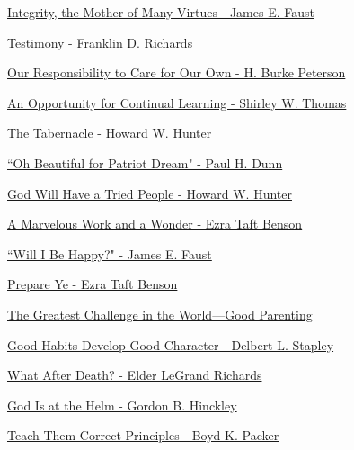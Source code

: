 \href{https://www.lds.org/general-conference/1982/04/integrity-the-mother-of-many-virtues?lang=eng}{Integrity, the Mother of Many Virtues - James E. Faust}

\href{https://www.lds.org/general-conference/1974/04/testimony?lang=eng}{Testimony - Franklin D. Richards}

\href{https://www.lds.org/general-conference/1981/04/our-responsibility-to-care-for-our-own?lang=eng}{Our Responsibility to Care for Our Own - H. Burke Peterson}

\href{https://www.lds.org/general-conference/1981/10/an-opportunity-for-continual-learning?lang=eng}{An Opportunity for Continual Learning - Shirley W. Thomas}

\href{https://www.lds.org/general-conference/1975/10/the-tabernacle?lang=eng}{The Tabernacle - Howard W. Hunter}

\href{https://www.lds.org/general-conference/1975/10/oh-beautiful-for-patriot-dream?lang=eng}{``Oh Beautiful for Patriot Dream" - Paul H. Dunn}

\href{https://www.lds.org/general-conference/1980/04/god-will-have-a-tried-people?lang=eng}{God Will Have a Tried People - Howard W. Hunter}

\href{https://www.lds.org/general-conference/1980/04/a-marvelous-work-and-a-wonder?lang=eng}{A Marvelous Work and a Wonder - Ezra Taft Benson}

\href{https://www.lds.org/general-conference/1987/04/will-i-be-happy?lang=eng}{``Will I Be Happy?" - James E. Faust}

\href{https://www.lds.org/general-conference/1973/10/prepare-ye?lang=eng}{Prepare Ye - Ezra Taft Benson}

\href{https://www.lds.org/general-conference/1990/10/the-greatest-challenge-in-the-world-good-parenting?lang=eng}{The Greatest Challenge in the World—Good Parenting}

\href{https://www.lds.org/general-conference/1974/10/good-habits-develop-good-character?lang=eng}{Good Habits Develop Good Character - Delbert L. Stapley}

\href{https://www.lds.org/general-conference/1974/10/what-after-death?lang=eng}{What After Death? - Elder LeGrand Richards}

\href{https://www.lds.org/general-conference/1994/04/god-is-at-the-helm?lang=eng}{God Is at the Helm - Gordon B. Hinckley}

\href{https://www.lds.org/general-conference/1990/04/teach-them-correct-principles?lang=eng}{Teach Them Correct Principles - Boyd K. Packer}

